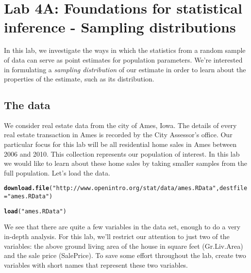 \documentclass{article}\usepackage[]{graphicx}\usepackage[]{color}
\makeatletter
\newcommand{\hlstr}[1]{\textcolor[rgb]{0.192,0.494,0.8}{#1}}%
\newcommand{\hlstd}[1]{\textcolor[rgb]{0.345,0.345,0.345}{#1}}%
\newcommand{\hlkwc}[1]{\textcolor[rgb]{0.333,0.667,0.333}{#1}}%
\newcommand{\hlkwd}[1]{\textcolor[rgb]{0.737,0.353,0.396}{\textbf{#1}}}%
\newenvironment{kframe}{%
 \def\at@end@of@kframe{}%
 \ifinner\ifhmode%
  \def\at@end@of@kframe{\end{minipage}}%
  \begin{minipage}{\columnwidth}%
 \fi\fi%
 \def\FrameCommand##1{\hskip\@totalleftmargin \hskip-\fboxsep
 \colorbox{shadecolor}{##1}\hskip-\fboxsep
     \hskip-\linewidth \hskip-\@totalleftmargin \hskip\columnwidth}%
 \MakeFramed {\advance\hsize-\width
   \@totalleftmargin\z@ \linewidth\hsize
   \@setminipage}}%
 {\par\unskip\endMakeFramed%
 \at@end@of@kframe}
\newenvironment{knitrout}{}{} %
\makeatother
\begin{document}

\section*{Lab 4A: Foundations for statistical inference - Sampling distributions}

In this lab, we investigate the ways in which the statistics from a random sample of data can serve as point estimates for population parameters.  We're interested in formulating a \emph{sampling distribution} of our estimate in order to learn about the properties of the estimate, such as its distribution.

\subsection*{The data}
We consider real estate data from the city of Ames, Iowa.  The details of every real estate transaction in Ames is recorded by the City Assessor's office.  Our particular focus for this lab will be all residential home sales in Ames between 2006 and 2010.  This collection represents our population of interest.  In this lab we would like to learn about these home sales by taking smaller samples from the full population.  Let's load the data.

\begin{knitrout}
\color{fgcolor}\begin{kframe}
\begin{alltt}
\hlkwd{download.file}\hlstd{(}\hlstr{"http://www.openintro.org/stat/data/ames.RData"}\hlstd{,} \hlkwc{destfile} \hlstd{=} \hlstr{"ames.RData"}\hlstd{)}

\hlkwd{load}\hlstd{(}\hlstr{"ames.RData"}\hlstd{)}
\end{alltt}
\end{kframe}
\end{knitrout}


We see that there are quite a few variables in the data set, enough to do a very in-depth analysis.  For this lab, we'll restrict our attention to just two of the variables: the above ground living area of the house in square feet (\hlstd{Gr.Liv.Area}) and the sale price (\hlstd{SalePrice}).  To save some effort throughout the lab, create two variables with short names that represent these two variables.  
\end{document}
